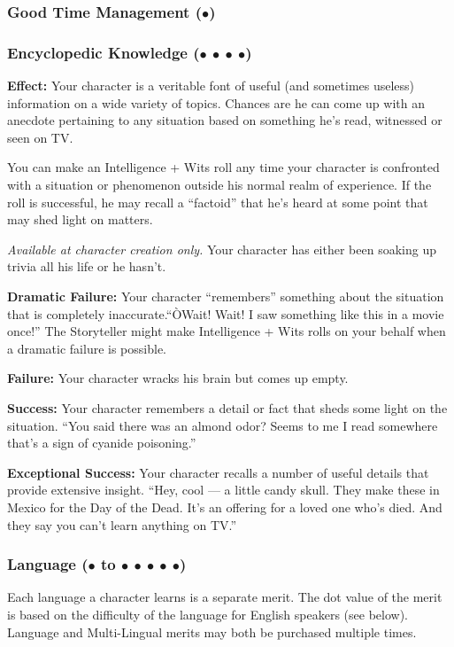 \documentclass["../Misguided by Starlight.tex"]{subfiles}
\begin{document}
	\subsubsection{Good Time Management ($\bullet$)} %
	
	\subsubsection{Encyclopedic Knowledge ($\bullet$ $\bullet$ $\bullet$ $\bullet$)} %
		\textbf{Effect:} Your character is a veritable font of useful (and sometimes useless) information on a wide variety of topics. Chances are he can come up with an anecdote pertaining to any situation based on something he's read, witnessed or seen on TV.
		
		You can make an Intelligence + Wits roll any time your character is confronted with a situation or phenomenon outside his normal realm of experience. If the roll is successful, he may recall a ``factoid'' that he's heard at some point that may shed light on matters.
		
		\emph{Available at character creation only.} Your character has either been soaking up trivia all his life or he hasn't.
		
		\textbf{Dramatic Failure:} Your character ``remembers'' something about the situation that is completely inaccurate.``ÒWait! Wait! I saw something like this in a movie once!'' The Storyteller might make Intelligence + Wits rolls on your behalf when a dramatic failure is possible.
		
		\textbf{Failure:} Your character wracks his brain but comes up empty.
		
		\textbf{Success:} Your character remembers a detail or fact that sheds some light on the situation. ``You said there was an almond odor? Seems to me I read somewhere that's a sign of cyanide poisoning.''
		
		\textbf{Exceptional Success:} Your character recalls a number of useful details that provide extensive insight. ``Hey, cool --- a little candy skull. They make these in Mexico for the Day of the Dead. It's an offering for a loved one who's died. And they say you can't learn anything on TV.''
	
	\subsubsection{Language ($\bullet$ to $\bullet$ $\bullet$ $\bullet$ $\bullet$ $\bullet$)} %
		Each language a character learns is a separate merit. The dot value of the merit is based on the difficulty of the language for English speakers (see below). Language and Multi-Lingual merits may both be purchased multiple times.
\end{document}
